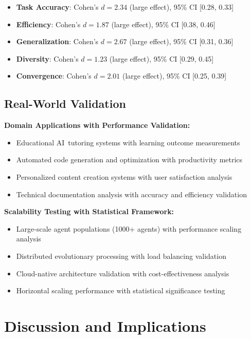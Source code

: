 \documentclass[10pt]{article}
\theoremstyle{definition}
\newcommand{\ai}{\textsc{AI}}
\begin{document}
\begin{itemize}
    \item \textbf{Task Accuracy}: Cohen's $d = 2.34$ (large effect), 95\% CI [0.28, 0.33]
    \item \textbf{Efficiency}: Cohen's $d = 1.87$ (large effect), 95\% CI [0.38, 0.46]
    \item \textbf{Generalization}: Cohen's $d = 2.67$ (large effect), 95\% CI [0.31, 0.36]
    \item \textbf{Diversity}: Cohen's $d = 1.23$ (large effect), 95\% CI [0.29, 0.45]
    \item \textbf{Convergence}: Cohen's $d = 2.01$ (large effect), 95\% CI [0.25, 0.39]
\end{itemize}

\subsection{Real-World Validation}

\textbf{Domain Applications with Performance Validation:}

\begin{itemize}
    \item Educational \ai\ tutoring systems with learning outcome measurements
    \item Automated code generation and optimization with productivity metrics
    \item Personalized content creation systems with user satisfaction analysis
    \item Technical documentation analysis with accuracy and efficiency validation
\end{itemize}

\textbf{Scalability Testing with Statistical Framework:}

\begin{itemize}
    \item Large-scale agent populations (1000+ agents) with performance scaling analysis
    \item Distributed evolutionary processing with load balancing validation
    \item Cloud-native architecture validation with cost-effectiveness analysis
    \item Horizontal scaling performance with statistical significance testing
\end{itemize}

\section{Discussion and Implications}
\end{document}
